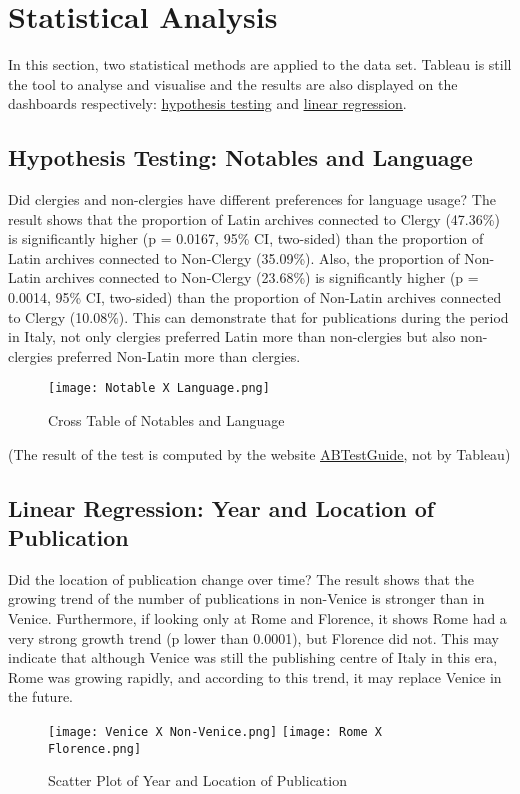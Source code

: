 \documentclass[11pt]{article}
\begin{document}
\section{Statistical Analysis}
In this section, two statistical methods are applied to the data set. Tableau is still the tool to analyse and visualise and the results are also displayed on the dashboards respectively: \href{https://public.tableau.com/app/profile/dhching/viz/TitleXLanguage/NotablesXLanguage}{\underline{hypothesis testing}} and \href{https://public.tableau.com/app/profile/dhching/viz/YearXLocationofPublication/YearXLocationofPublication}{\underline{linear regression}}.
\subsection{Hypothesis Testing: Notables and Language}
Did clergies and non-clergies have different preferences for language usage? The result shows that the proportion of Latin archives connected to Clergy (47.36\%) is significantly higher (p = 0.0167, 95\% CI, two-sided) than the proportion of Latin archives connected to Non-Clergy (35.09\%). Also, the proportion of Non-Latin archives connected to Non-Clergy (23.68\%) is significantly higher (p = 0.0014, 95\% CI, two-sided) than the proportion of Non-Latin archives connected to Clergy (10.08\%). This can demonstrate that for publications during the period in Italy, not only clergies preferred Latin more than non-clergies but also non-clergies preferred Non-Latin more than clergies.
\begin{figure}[H]
\centering
\texttt{[image: Notable X Language.png]}
\caption{Cross Table of Notables and Language}
\label{fig:plutchik}
\end{figure}
\noindent
(The result of the test is computed by the website \href{https://abtestguide.com/calc/}{\underline{ABTestGuide}}, not by Tableau)
\subsection{Linear Regression: Year and Location of Publication}
Did the location of publication change over time? The result shows that the growing trend of the number of publications in non-Venice is stronger than in Venice. Furthermore, if looking only at Rome and Florence, it shows Rome had a very strong growth trend (p lower than 0.0001), but Florence did not. This may indicate that although Venice was still the publishing centre of Italy in this era, Rome was growing rapidly, and according to this trend, it may replace Venice in the future.
\begin{figure}[H]
\centering
\texttt{[image: Venice X Non-Venice.png]}
\texttt{[image: Rome X Florence.png]}
\caption{Scatter Plot of Year and Location of Publication}
\label{fig:plutchik}
\end{figure}
\end{document}
